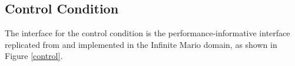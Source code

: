 \documentclass[10pt,journal,compsoc]{IEEEtran}
\begin{document}
\subsection{Control Condition} 
The interface for the control condition is the performance-informative interface replicated from \cite{li2015using} and implemented in the Infinite %
Mario domain, as shown in Figure \ref{control}. %


\end{document}
